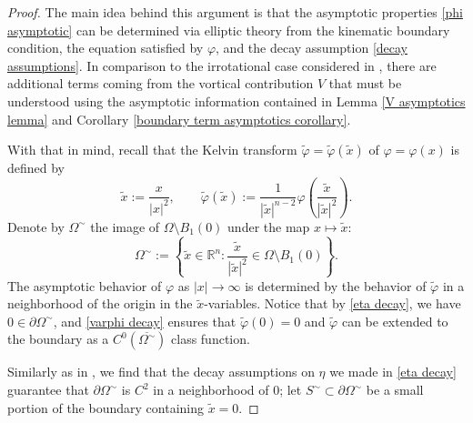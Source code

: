 \documentclass[11pt,reqno]{amsart}
\newcommand{\R}{\mathbb{R}}
\theoremstyle{plain}
\theoremstyle{remark}
\numberwithin{equation}{section}
\begin{document}
\begin{proof}
The main idea behind this argument is that the asymptotic properties \eqref{phi asymptotic} can be determined via elliptic theory from the kinematic boundary condition, the equation satisfied by $\varphi$, and the decay assumption \eqref{decay assumptions}.  In comparison to the irrotational case considered in \cite{wheeler2016integral}, there are additional terms coming from the vortical contribution $V$ that must be understood using the asymptotic information contained in Lemma \ref{V asymptotics lemma} and Corollary \ref{boundary term asymptotics corollary}.  

  With that in mind, recall that the Kelvin transform $\tilde\varphi = \tilde\varphi(\tilde x)$ of $\varphi = \varphi(x)$ is defined by 
\[ \tilde{x} := \frac{x}{|x|^2}, \qquad \tilde\varphi (\tilde x) := \frac{1}{|\tilde x|^{n-2}} \varphi \left( \frac{\tilde x}{|\tilde x|^2} \right).  \]
Denote by $\Omega^{\sim}$ the image of $\Omega \setminus B_1(0)$ under the map $x \mapsto \tilde x$: 
\[ \Omega^\sim := \left\{ \tilde{x} \in \R^n : \frac{\tilde{x}}{|\tilde x|^2} \in \Omega \setminus B_1(0) \right\}.\]
The asymptotic behavior of $\varphi$ as $|x| \to \infty$ is determined by the behavior of $\tilde \varphi$ in a neighborhood of the origin in the $\tilde x$-variables.  Notice that by \eqref{eta decay}, we have $0 \in \partial \Omega^\sim$, and \eqref{varphi decay} ensures that $\tilde\varphi (0) = 0$ and $\tilde \varphi$ can be extended to the boundary as a $C^0(\overline{\Omega^\sim})$ class function.  

Similarly as in \cite[Appendix A]{wheeler2016integral}, we find that the decay assumptions on $\eta$ we made in \eqref{eta decay} guarantee that $\partial \Omega^\sim$ is $C^2$ in a neighborhood of $0$; let $S^\sim \subset \partial \Omega^\sim$ be a small portion of the boundary containing $\tilde x =0$.  


\end{proof}
\end{document}
